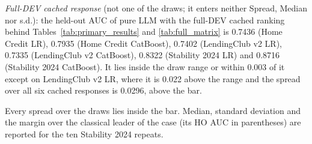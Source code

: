 \documentclass[final,5p,twocolumn]{elsarticle}
\begin{document}
\begin{table}[htbp]
\begin{threeparttable}
\begin{tablenotes}
\item \emph{Full-DEV cached response} (not one of the draws; it enters neither Spread, Median nor s.d.): the held-out AUC of pure LLM with the full-DEV cached ranking behind Tables~\ref{tab:primary_results} and \ref{tab:full_matrix} is 0.7436 (Home Credit LR), 0.7935 (Home Credit CatBoost), 0.7402 (LendingClub v2 LR), 0.7335 (LendingClub v2 CatBoost), 0.8322 (Stability 2024 LR) and 0.8716 (Stability 2024 CatBoost). It lies inside the draw range or within 0.003 of it except on LendingClub v2 LR, where it is 0.022 above the range and the spread over all six cached responses is 0.0296, above the bar.
\item Every spread over the draws lies inside the bar. Median, standard deviation and the margin over the classical leader of the case (its HO AUC in parentheses) are reported for the ten Stability 2024 repeats.
\end{tablenotes}
\end{threeparttable}
\end{table}
\end{document}
